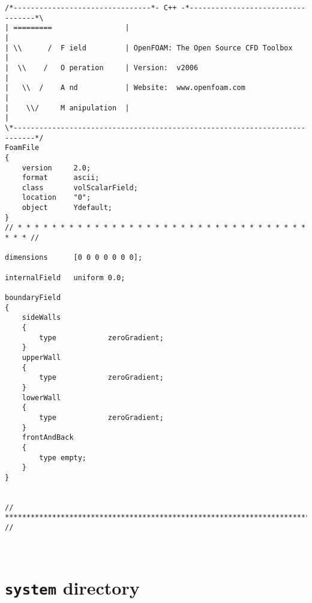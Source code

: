 \begin{lstlisting}[style=cpp,title=\texttt{0/Ydefault},captionpos=t]
/*--------------------------------*- C++ -*----------------------------------*\
| =========                 |                                                 |
| \\      /  F ield         | OpenFOAM: The Open Source CFD Toolbox           |
|  \\    /   O peration     | Version:  v2006                                 |
|   \\  /    A nd           | Website:  www.openfoam.com                      |
|    \\/     M anipulation  |                                                 |
\*---------------------------------------------------------------------------*/
FoamFile
{
    version     2.0;
    format      ascii;
    class       volScalarField;
    location    "0";
    object      Ydefault;
}
// * * * * * * * * * * * * * * * * * * * * * * * * * * * * * * * * * * * * * //

dimensions      [0 0 0 0 0 0 0];

internalField   uniform 0.0;

boundaryField
{
    sideWalls
    {
        type            zeroGradient;
    }
    upperWall
    {
        type            zeroGradient;
    }
    lowerWall
    {
        type            zeroGradient;
    }
    frontAndBack
    { 
        type empty;
    }
}


// ************************************************************************* //



\end{lstlisting}

\section{\texttt{system} directory}
\label{sec:appsystem}

